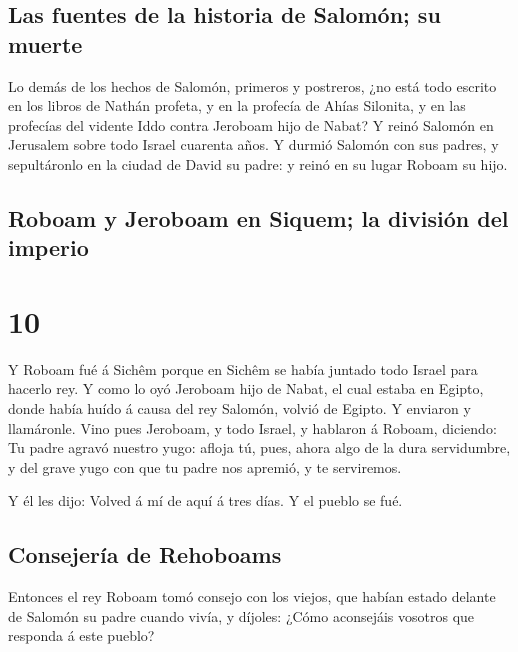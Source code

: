\hypertarget{las-fuentes-de-la-historia-de-salomuxf3n-su-muerte}{%
\subsection{Las fuentes de la historia de Salomón; su
muerte}\label{las-fuentes-de-la-historia-de-salomuxf3n-su-muerte}}

 Lo demás de los hechos de Salomón, primeros y postreros,
¿no está todo escrito en los libros de Nathán profeta, y en la profecía
de Ahías Silonita, y en las profecías del vidente Iddo contra Jeroboam
hijo de Nabat?  Y reinó Salomón en Jerusalem sobre todo
Israel cuarenta años.  Y durmió Salomón con sus padres, y
sepultáronlo en la ciudad de David su padre: y reinó en su lugar Roboam
su hijo.

\hypertarget{roboam-y-jeroboam-en-siquem-la-divisiuxf3n-del-imperio}{%
\subsection{Roboam y Jeroboam en Siquem; la división del
imperio}\label{roboam-y-jeroboam-en-siquem-la-divisiuxf3n-del-imperio}}

\hypertarget{section-14-10}{%
\section{10}\label{section-14-10}}

 Y Roboam fué á Sichêm porque en Sichêm se había juntado
todo Israel para hacerlo rey.  Y como lo oyó Jeroboam hijo
de Nabat, el cual estaba en Egipto, donde había huído á causa del rey
Salomón, volvió de Egipto.  Y enviaron y llamáronle. Vino
pues Jeroboam, y todo Israel, y hablaron á Roboam, diciendo:
 Tu padre agravó nuestro yugo: afloja tú, pues, ahora algo
de la dura servidumbre, y del grave yugo con que tu padre nos apremió, y
te serviremos.

 Y él les dijo: Volved á mí de aquí á tres días. Y el
pueblo se fué.

\hypertarget{consejeruxeda-de-rehoboams}{%
\subsection{Consejería de Rehoboams}\label{consejeruxeda-de-rehoboams}}

 Entonces el rey Roboam tomó consejo con los viejos, que
habían estado delante de Salomón su padre cuando vivía, y díjoles: ¿Cómo
aconsejáis vosotros que responda á este pueblo?

